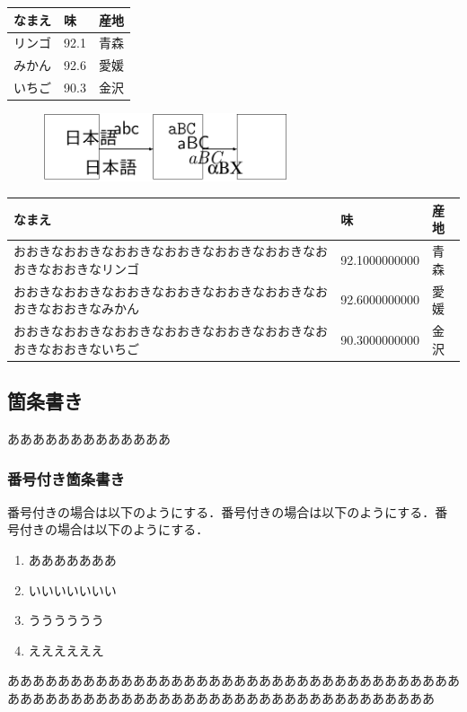 \begin{multicols*}{2}
\begin{Table} %
	\centering
	\label{TBL_XYZ}
	\vspace{-2mm}
	\begin{tabular}{|l|l|l|}
		\hline
			なまえ & 味 & 産地\\
		\hline
				リンゴ & 92.1 & 青森\\
				みかん & 92.6 & 愛媛\\
				いちご & 90.3 & 金沢\\
		\hline
	\end{tabular}
\end{Table}
\begin{figure} %
	\centering
	\includegraphics[height=2cm,width=\linewidth]{fig/concept.pdf}
\label{FIG_CAT}
\end{figure}
\begin{table} %
	\centering
{}\label{TAB_ALPHA}
	\begin{tabular}{|l|l|l|}
		\hline
			なまえ & 味 & 産地\\
		\hline
			おおきなおおきなおおきなおおきなおおきなおおきなおおきなおおきなリンゴ & 92.1000000000 & 青森\\
			おおきなおおきなおおきなおおきなおおきなおおきなおおきなおおきなみかん & 92.6000000000 & 愛媛\\
			おおきなおおきなおおきなおおきなおおきなおおきなおおきなおおきないちご & 90.3000000000 & 金沢\\
		\hline
	\end{tabular}
\end{table}


\subsection{箇条書き}
あああああああああああああ
\subsubsection{番号付き箇条書き}
番号付きの場合は以下のようにする．番号付きの場合は以下のようにする．番号付きの場合は以下のようにする．
\begin{enumerate}
 \item あああああああ
\item いいいいいいい
\item うううううう
\item ええええええ
\end{enumerate}
ああああああああああああああああああああああああああああああああああああああああああああああああああああああああああああああああああああああ

\end{multicols*}
